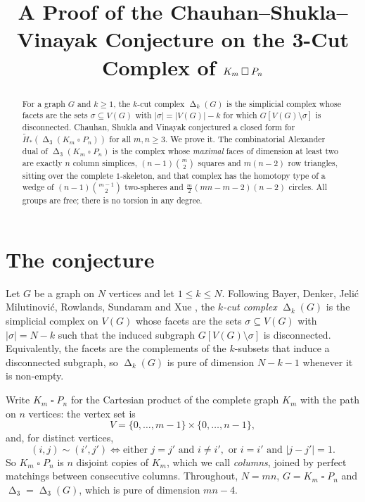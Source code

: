 \documentclass[11pt]{amsart}
\title[The 3-cut complex of a clique times a path]
{A Proof of the Chauhan--Shukla--Vinayak Conjecture on the 3-Cut Complex of $K_m \bbox P_n$}
\date{}
\DeclareMathOperator{\Cut}{\Delta}
\newcommand{\Hred}{\widetilde H}
\newcommand{\bbox}{\mathbin{\square}}
\begin{document}
\begin{abstract}
For a graph $G$ and $k \ge 1$, the $k$-cut complex $\Cut_k(G)$ is the simplicial complex whose
facets are the sets $\sigma \subseteq V(G)$ with $|\sigma| = |V(G)| - k$ for which
$G[V(G) \setminus \sigma]$ is disconnected. Chauhan, Shukla and Vinayak conjectured a closed form
for $\Hred_*(\Cut_3(K_m \bbox P_n))$ for all $m, n \ge 3$. We prove it. The combinatorial
Alexander dual of $\Cut_3(K_m \bbox P_n)$ is the complex whose \emph{maximal} faces of dimension
at least two are exactly $n$ column simplices, $(n-1)\binom{m}{2}$ squares and $m(n-2)$ row
triangles, sitting over the complete $1$-skeleton, and that complex has the homotopy type of a
wedge of $(n-1)\binom{m-1}{2}$ two-spheres and $\frac{m}{2}(mn-m-2)(n-2)$ circles. All groups are
free; there is no torsion in any degree.
\end{abstract}

\maketitle

\section{The conjecture}

Let $G$ be a graph on $N$ vertices and let $1 \le k \le N$. Following Bayer, Denker,
Jeli\'c Milutinovi\'c, Rowlands, Sundaram and Xue \cite{BayerI}, the \emph{$k$-cut complex}
$\Cut_k(G)$ is the simplicial complex on $V(G)$ whose facets are the sets
$\sigma \subseteq V(G)$ with $|\sigma| = N-k$ such that the induced subgraph
$G[V(G)\setminus\sigma]$ is disconnected. Equivalently, the facets are the complements of the
$k$-subsets that induce a disconnected subgraph, so $\Cut_k(G)$ is pure of dimension $N-k-1$
whenever it is non-empty.

Write $K_m \bbox P_n$ for the Cartesian product of the complete graph $K_m$ with the path on $n$
vertices: the vertex set is
\begin{equation}\label{eq:host}
  V = \{0,\dots,m-1\}\times\{0,\dots,n-1\},
\end{equation}
and, for distinct vertices,
\begin{equation}\label{eq:adj}
  (i,j) \sim (i',j')
  \iff
  \text{either } j = j' \text{ and } i \ne i',
  \text{ or } i = i' \text{ and } |j-j'| = 1.
\end{equation}
So $K_m \bbox P_n$ is $n$ disjoint copies of $K_m$, which we call \emph{columns}, joined by
perfect matchings between consecutive columns. Throughout, $N = mn$, $G = K_m \bbox P_n$ and
$\Cut_3 = \Cut_3(G)$, which is pure of dimension $mn-4$.
\end{document}
